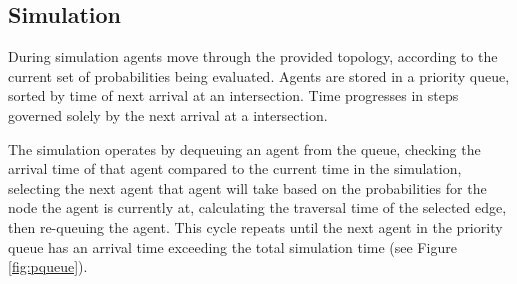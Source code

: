 \documentclass{sig-alternate-05-2015}
\begin{document}
%

\subsection{Simulation}
During simulation agents move through the provided topology, according
to the current set of probabilities being evaluated.  Agents are
stored in a priority queue, sorted by time of next arrival at an
intersection. Time progresses in steps governed solely by the next
arrival at a intersection.

The simulation operates by dequeuing an agent from the queue,
checking the arrival time of that agent compared to the current
time in the simulation, selecting the next agent that agent will take 
based on the probabilities for the node the agent is currently at, 
calculating the traversal time of the selected edge, then re-queuing the 
agent. This cycle repeats until the next agent in the priority queue has an 
arrival time exceeding the total simulation time (see Figure \ref{fig:pqueue}).
\end{document}

